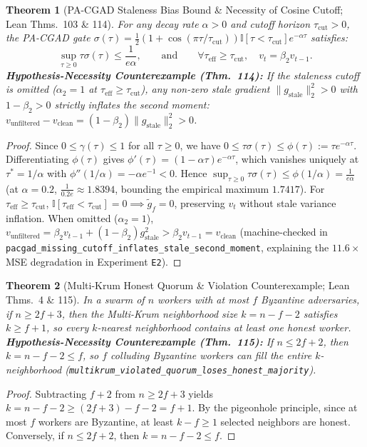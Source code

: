 \documentclass[11pt,a4paper]{article}
\newtheorem{theorem}{Theorem}[section]
\begin{document}
\begin{theorem}[PA-CGAD Staleness Bias Bound \& Necessity of Cosine Cutoff; Lean Thms.\ 103 \& 114]
\label{thm:pacgad_bound}
For any decay rate $\alpha > 0$ and cutoff horizon $\tau_{\text{cut}} > 0$, the PA-CGAD gate $\sigma(\tau) = \frac{1}{2}\!\left(1 + \cos(\pi\tau/\tau_{\text{cut}})\right)\mathbb{I}[\tau < \tau_{\text{cut}}]e^{-\alpha\tau}$ satisfies:
\begin{equation}
    \sup_{\tau \ge 0} \tau \sigma(\tau) \le \frac{1}{e\alpha}, \qquad \text{and} \qquad \forall \tau_{\text{eff}} \ge \tau_{\text{cut}}, \quad v_t = \beta_2 v_{t-1}.
\end{equation}
\textbf{Hypothesis-Necessity Counterexample (Thm.\ 114):} If the staleness cutoff is omitted ($\alpha_2 = 1$ at $\tau_{\text{eff}} \ge \tau_{\text{cut}}$), any non-zero stale gradient $\|g_{\text{stale}}\|_2^2 > 0$ with $1-\beta_2 > 0$ strictly inflates the second moment: $v_{\text{unfiltered}} - v_{\text{clean}} = (1-\beta_2)\|g_{\text{stale}}\|_2^2 > 0$.
\end{theorem}
\begin{proof}
Since $0 \le \gamma(\tau) \le 1$ for all $\tau \ge 0$, we have $0 \le \tau\sigma(\tau) \le \phi(\tau) := \tau e^{-\alpha\tau}$. Differentiating $\phi(\tau)$ gives $\phi'(\tau) = (1 - \alpha\tau)e^{-\alpha\tau}$, which vanishes uniquely at $\tau^* = 1/\alpha$ with $\phi''(1/\alpha) = -\alpha e^{-1} < 0$. Hence $\sup_{\tau \ge 0} \tau\sigma(\tau) \le \phi(1/\alpha) = \frac{1}{e\alpha}$ (at $\alpha=0.2$, $\frac{1}{0.2e} \approx 1.8394$, bounding the empirical maximum $1.7417$). For $\tau_{\text{eff}} \ge \tau_{\text{cut}}$, $\mathbb{I}[\tau_{\text{eff}} < \tau_{\text{cut}}] = 0 \implies \tilde{g}_f = 0$, preserving $v_t$ without stale variance inflation. When omitted ($\alpha_2 = 1$), $v_{\text{unfiltered}} = \beta_2 v_{t-1} + (1-\beta_2)g_{\text{stale}}^2 > \beta_2 v_{t-1} = v_{\text{clean}}$ (machine-checked in \texttt{pacgad\_missing\_cutoff\_inflates\_stale\_second\_moment}, explaining the $11.6\times$ MSE degradation in Experiment \texttt{E2}).
\end{proof}

\begin{theorem}[Multi-Krum Honest Quorum \& Violation Counterexample; Lean Thms.\ 4 \& 115]
\label{thm:multikrum_necessity}
In a swarm of $n$ workers with at most $f$ Byzantine adversaries, if $n \ge 2f + 3$, then the Multi-Krum neighborhood size $k = n - f - 2$ satisfies $k \ge f + 1$, so every $k$-nearest neighborhood contains at least one honest worker. \textbf{Hypothesis-Necessity Counterexample (Thm.\ 115):} If $n \le 2f + 2$, then $k = n - f - 2 \le f$, so $f$ colluding Byzantine workers can fill the entire $k$-neighborhood (\texttt{multikrum\_violated\_quorum\_loses\_honest\_majority}).
\end{theorem}
\begin{proof}
Subtracting $f + 2$ from $n \ge 2f + 3$ yields $k = n - f - 2 \ge (2f + 3) - f - 2 = f + 1$. By the pigeonhole principle, since at most $f$ workers are Byzantine, at least $k - f \ge 1$ selected neighbors are honest. Conversely, if $n \le 2f + 2$, then $k = n - f - 2 \le f$.
\end{proof}
\end{document}
